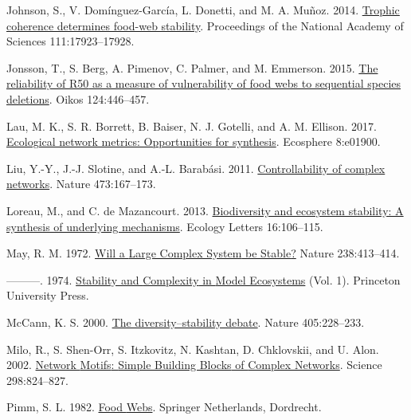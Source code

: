 \documentclass[
]{article}
\newlength{\cslhangindent}
\newenvironment{CSLReferences}[2] %
 {\begin{list}{}{%
  \setlength{\itemindent}{0pt}
  \setlength{\leftmargin}{0pt}
  \setlength{\parsep}{0pt}
  \ifodd #1
   \setlength{\leftmargin}{\cslhangindent}
   \setlength{\itemindent}{-1\cslhangindent}
  \fi
  \setlength{\itemsep}{#2\baselineskip}}}
 {\end{list}}
\begin{document}
\begin{CSLReferences}{0}{0}
Johnson, S., V. Domínguez-García, L. Donetti, and M. A. Muñoz. 2014.
\href{https://doi.org/10.1073/pnas.1409077111}{Trophic coherence
determines food-web stability}. Proceedings of the National Academy of
Sciences 111:17923--17928.

Jonsson, T., S. Berg, A. Pimenov, C. Palmer, and M. Emmerson. 2015.
\href{https://doi.org/10.1111/oik.01588}{The reliability of {R50} as a
measure of vulnerability of food webs to sequential species deletions}.
Oikos 124:446--457.

Lau, M. K., S. R. Borrett, B. Baiser, N. J. Gotelli, and A. M. Ellison.
2017. \href{https://doi.org/10.1002/ecs2.1900}{Ecological network
metrics: Opportunities for synthesis}. Ecosphere 8:e01900.

Liu, Y.-Y., J.-J. Slotine, and A.-L. Barabási. 2011.
\href{https://doi.org/10.1038/nature10011}{Controllability of complex
networks}. Nature 473:167--173.

Loreau, M., and C. de Mazancourt. 2013.
\href{https://doi.org/10.1111/ele.12073}{Biodiversity and ecosystem
stability: A synthesis of underlying mechanisms}. Ecology Letters
16:106--115.

May, R. M. 1972. \href{https://doi.org/10.1038/238413a0}{Will a {Large
Complex System} be {Stable}?} Nature 238:413--414.

---------. 1974. \href{https://doi.org/10.2307/j.ctvs32rq4}{Stability
and {Complexity} in {Model Ecosystems}} (Vol. 1). Princeton University
Press.

McCann, K. S. 2000. \href{https://doi.org/10.1038/35012234}{The
diversity--stability debate}. Nature 405:228--233.

Milo, R., S. Shen-Orr, S. Itzkovitz, N. Kashtan, D. Chklovskii, and U.
Alon. 2002. \href{https://doi.org/10.1126/science.298.5594.824}{Network
{Motifs}: {Simple Building Blocks} of {Complex Networks}}. Science
298:824--827.

Pimm, S. L. 1982. \href{https://doi.org/10.1007/978-94-009-5925-5}{Food
{Webs}}. Springer Netherlands, Dordrecht.


\end{CSLReferences}
\end{document}
